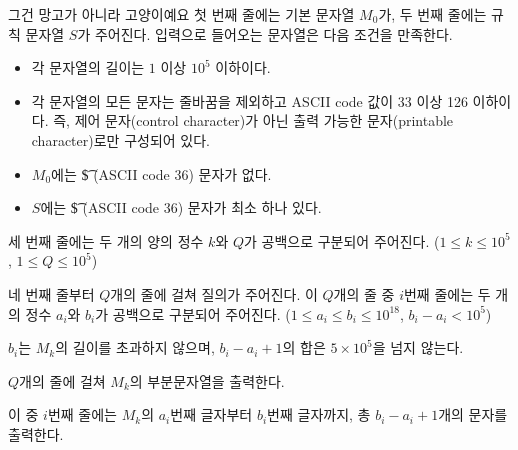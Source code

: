 \begin{problem}{그건 망고가 아니라 고양이예요}
    \InputFile
    첫 번째 줄에는 기본 문자열 $M_0$가, 두 번째 줄에는 규칙 문자열 $S$가 주어진다. 입력으로 들어오는 문자열은 다음 조건을 만족한다.
    
    \begin{itemize}
        \item 각 문자열의 길이는 $1$ 이상 $10^5$ 이하이다.
        \item 각 문자열의 모든 문자는 줄바꿈을 제외하고 ASCII code 값이 33 이상 126 이하이다. 즉, 제어 문자(control character)가 아닌 출력 가능한 문자(printable character)로만 구성되어 있다.
        \item $M_0$에는 \t{\$} (ASCII code 36) 문자가 없다.
        \item $S$에는 \t{\$} (ASCII code 36) 문자가 최소 하나 있다.
    \end{itemize}
    
    세 번째 줄에는 두 개의 양의 정수 $k$와 $Q$가 공백으로 구분되어 주어진다. ($1 \leq k \leq 10^5$, $1 \leq Q \leq 10^5$)
    
    네 번째 줄부터 $Q$개의 줄에 걸쳐 질의가 주어진다. 이 $Q$개의 줄 중 $i$번째 줄에는 두 개의 정수 $a_i$와 $b_i$가 공백으로 구분되어 주어진다. ($1 \leq a_i \leq b_i \leq 10^{18}$, $b_i - a_i < 10^5$)
    
    $b_i$는 $M_k$의 길이를 초과하지 않으며, $b_i - a_i + 1$의 합은 $5 \times 10^5$을 넘지 않는다.
    
    \OutputFile
    $ Q $개의 줄에 걸쳐 $M_k$의 부분문자열을 출력한다.
    
    이 중 $i$번째 줄에는 $M_k$의 $a_i$번째 글자부터 $b_i$번째 글자까지, 총 $b_i-a_i+1$개의 문자를 출력한다.
    
    \Examples
    \begin{example}
    \end{example}
    
    \begin{examplewide}
    \end{examplewide}
\end{problem}

